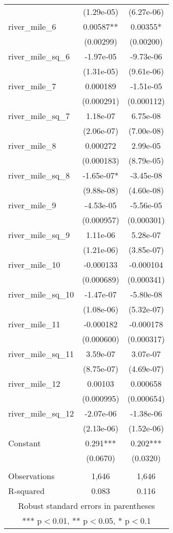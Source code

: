 \begin{tabular}{lcc}
 & (1.29e-05) & (6.27e-06) \\
river\_mile\_6 & 0.00587** & 0.00355* \\
 & (0.00299) & (0.00200) \\
river\_mile\_sq\_6 & -1.97e-05 & -9.73e-06 \\
 & (1.31e-05) & (9.61e-06) \\
river\_mile\_7 & 0.000189 & -1.51e-05 \\
 & (0.000291) & (0.000112) \\
river\_mile\_sq\_7 & 1.18e-07 & 6.75e-08 \\
 & (2.06e-07) & (7.00e-08) \\
river\_mile\_8 & 0.000272 & 2.99e-05 \\
 & (0.000183) & (8.79e-05) \\
river\_mile\_sq\_8 & -1.65e-07* & -3.45e-08 \\
 & (9.88e-08) & (4.60e-08) \\
river\_mile\_9 & -4.53e-05 & -5.56e-05 \\
 & (0.000957) & (0.000301) \\
river\_mile\_sq\_9 & 1.11e-06 & 5.28e-07 \\
 & (1.21e-06) & (3.85e-07) \\
river\_mile\_10 & -0.000133 & -0.000104 \\
 & (0.000689) & (0.000341) \\
river\_mile\_sq\_10 & -1.47e-07 & -5.80e-08 \\
 & (1.08e-06) & (5.32e-07) \\
river\_mile\_11 & -0.000182 & -0.000178 \\
 & (0.000600) & (0.000317) \\
river\_mile\_sq\_11 & 3.59e-07 & 3.07e-07 \\
 & (8.75e-07) & (4.69e-07) \\
river\_mile\_12 & 0.00103 & 0.000658 \\
 & (0.000995) & (0.000654) \\
river\_mile\_sq\_12 & -2.07e-06 & -1.38e-06 \\
 & (2.13e-06) & (1.52e-06) \\
Constant & 0.291*** & 0.202*** \\
 & (0.0670) & (0.0320) \\
 &  &  \\
Observations & 1,646 & 1,646 \\
 R-squared & 0.083 & 0.116 \\ \hline
\multicolumn{3}{c}{ Robust standard errors in parentheses} \\
\multicolumn{3}{c}{ *** p$<$0.01, ** p$<$0.05, * p$<$0.1} \\
\end{tabular}
